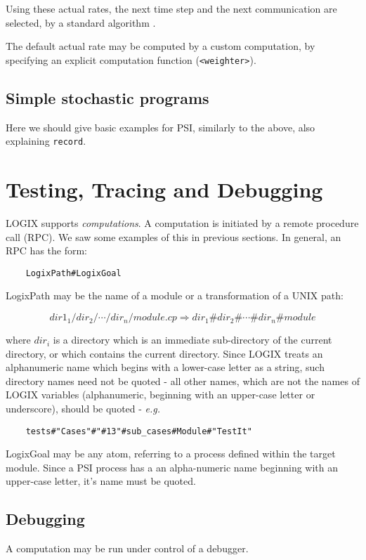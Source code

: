 Using these actual rates, the next time step and the next
communication are selected, by a standard algorithm \cite{Gil77}.

The default actual rate may be computed by a custom computation,
by specifying an explicit computation function (\verb+<weighter>+).

\section{Simple stochastic programs}

Here we should give basic examples for PSI, similarly to
the above, also explaining \verb+record+.


\chapter{Testing, Tracing and Debugging}
\label{debug}

LOGIX supports {\em computations}.  A computation is initiated by
a remote procedure call (RPC).  We saw some examples of this in
previous sections.  In general, an RPC has the form:

\begin{verbatim}
    LogixPath#LogixGoal
\end{verbatim}

\noindent
LogixPath may be the name of a module or a transformation of a UNIX path:

\[dir1_{1}/dir_{2}/ \cdots /dir_{n}/module.cp  \Rightarrow  dir_{1}\#dir_{2}\# \cdots \#dir_{n}\#module\]

\noindent
where $dir_{i}$ is a directory which is an immediate sub-directory
of the current directory, or which contains the current directory.
Since LOGIX treats an alphanumeric name which begins with a lower-case
letter as a string, such directory names need not be quoted - all
other names, which are not the names of LOGIX variables (alphanumeric,
beginning with an upper-case letter or underscore), should be quoted -
{\em e.g.}

\begin{verbatim}
    tests#"Cases"#"#13"#sub_cases#Module#"TestIt"
\end{verbatim}

\noindent
LogixGoal may be any atom, referring to a process defined within
the target module.  Since a PSI process has a an alpha-numeric name
beginning with an upper-case letter, it's name must be quoted.

\section{Debugging}
\label{debugger}
A computation may be run under control of a debugger.

